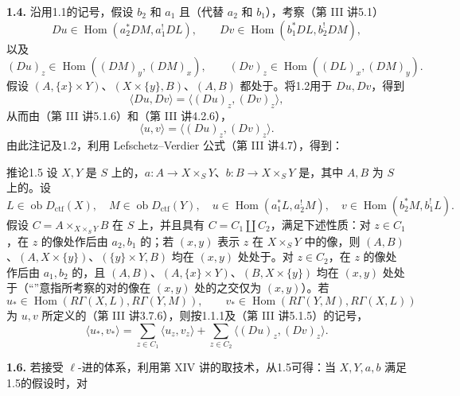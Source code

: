 \textbf{1.4.} 沿用1.1的记号，假设 $b_2$ 和 $a_1$ 且（代替 $a_2$ 和 $b_1$），考察（第 III 讲5.1）
\[
 Du\in\operatorname{Hom}(a_2^*DM,a_1^!DL),\qquad
 Dv\in\operatorname{Hom}(b_1^*DL,b_2^!DM),
\]
以及
\[
 (Du)_z\in\operatorname{Hom}((DM)_y,(DM)_x),\qquad
 (Dv)_z\in\operatorname{Hom}((DL)_x,(DM)_y).
\]
假设 $(A,\{x\}\times Y)$、$(X\times\{y\},B)$、$(A,B)$ 都处于。将1.2用于 $Du,Dv$，得到
\[
 \langle Du,Dv\rangle=\langle(Du)_z,(Dv)_z\rangle,
\]
从而由（第 III 讲5.1.6）和（第 III 讲4.2.6），
\[
 \langle u,v\rangle=\langle(Du)_z,(Dv)_z\rangle.\tag{1.4.1}
\]
由此注记及1.2，利用 Lefschetz--Verdier 公式（第 III 讲4.7），得到：
\begin{SGAresult}{推论}{1.5}
设 $X,Y$ 是 $S$ 上的，$a:A\to X\times_S Y$、$b:B\to X\times_S Y$ 是，其中 $A,B$ 为 $S$ 上的。设
\[
 L\in\operatorname{ob}D_{\mathrm{ctf}}(X),\quad M\in\operatorname{ob}D_{\mathrm{ctf}}(Y),\quad
 u\in\operatorname{Hom}(a_1^*L,a_2^!M),\quad v\in\operatorname{Hom}(b_2^*M,b_1^!L).
\]
假设 $C=A\times_{X\times_S Y}B$ 在 $S$ 上，并且具有 $C=C_1\amalg C_2$，满足下述性质：对 $z\in C_1$，在 $z$ 的像处作后由 $a_2,b_1$ 的；若 $(x,y)$ 表示 $z$ 在 $X\times_S Y$ 中的像，则 $(A,B)$、$(A,X\times\{y\})$、$(\{y\}\times Y,B)$ 均在 $(x,y)$ 处处于。对 $z\in C_2$，在 $z$ 的像处作后由 $a_1,b_2$ 的，且 $(A,B)$、$(A,\{x\}\times Y)$、$(B,X\times\{y\})$ 均在 $(x,y)$ 处处于（“”意指所考察的对的像在 $(x,y)$ 处的之交仅为 $(x,y)$）。若
\[
 u_*\in\operatorname{Hom}(R\Gamma(X,L),R\Gamma(Y,M)),\qquad
 v_*\in\operatorname{Hom}(R\Gamma(Y,M),R\Gamma(X,L))
\]
为 $u,v$ 所定义的（第 III 讲3.7.6），则按1.1.1及（第 III 讲5.1.5）的记号，
\[
 \langle u_*,v_*\rangle=
 \sum_{z\in C_1}\langle u_z,v_z\rangle+
 \sum_{z\in C_2}\langle(Du)_z,(Dv)_z\rangle.\tag{1.5.1}
\]
\end{SGAresult}
\textbf{1.6.} 若接受 $\ell$-进的体系，利用第 XIV 讲的取技术，从1.5可得：当 $X,Y,a,b$ 满足1.5的假设时，对
